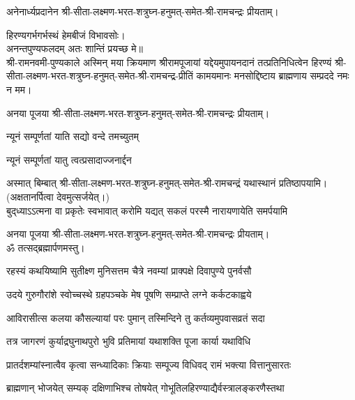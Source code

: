 अनेनार्ध्यप्रदानेन श्री-सीता-लक्ष्मण-भरत-शत्रुघ्न-हनुमत्-समेत-श्री-रामचन्द्रः प्रीयताम्।


हिरण्यगर्भगर्भस्थं हेमबीजं विभावसोः।\\
अनन्तपुण्यफलदम् अतः शान्तिं प्रयच्छ मे॥\\

श्री-रामनवमी-पुण्यकाले अस्मिन् मया क्रियमाण श्रीरामपूजायां यद्देयमुपायनदानं तत्प्रतिनिधित्वेन हिरण्यं श्री-सीता-लक्ष्मण-भरत-शत्रुघ्न-हनुमत्-समेत-श्री-रामचन्द्र-प्रीतिं 
कामयमानः मनसोद्दिष्टाय ब्राह्मणाय सम्प्रददे नमः न मम। 

अनया पूजया श्री-सीता-लक्ष्मण-भरत-शत्रुघ्न-हनुमत्-समेत-श्री-रामचन्द्रः प्रीयताम्। 
 
{न्यूनं सम्पूर्णतां याति सद्यो वन्दे तमच्युतम्} 

{न्यूनं सम्पूर्णतां यातु त्वत्प्रसादाज्जनार्द्दन}

अस्मात् बिम्बात् श्री-सीता-लक्ष्मण-भरत-शत्रुघ्न-हनुमत्-समेत-श्री-रामचन्द्रं यथास्थानं प्रतिष्ठापयामि।\\
(अक्षतानर्पित्वा देवमुत्सर्जयेत्।)\\

{बुद्‌ध्याऽऽत्मना वा प्रकृतेः स्वभावात्}
{करोमि यद्यत् सकलं परस्मै}
{नारायणायेति समर्पयामि}

अनया पूजया श्री-सीता-लक्ष्मण-भरत-शत्रुघ्न-हनुमत्-समेत-श्री-रामचन्द्रः प्रीयताम्। \\
ॐ तत्सद्ब्रह्मार्पणमस्तु।
 
\twolineshloka
{रहस्यं कथयिष्यामि सुतीक्ष्ण मुनिसत्तम}
{चैत्रे नवम्यां प्राक्पक्षे दिवापुण्ये पुनर्वसौ}%

\twolineshloka
{उदये गुरुगौरांशे स्वोच्चस्थे ग्रहपञ्चके}
{मेष पूषणि सम्प्राप्ते लग्ने कर्कटकाह्वये}%

\twolineshloka
{आविरासीत्स कलया कौसल्यायां परः पुमान्}
{तस्मिन्दिने तु कर्तव्यमुपवासव्रतं सदा}%

\twolineshloka
{तत्र जागरणं कुर्याद्रघुनाथपुरो भुवि}%
{प्रतिमायां यथाशक्ति पूजा कार्या यथाविधि}%

\twolineshloka
{प्रातर्दशम्यांस्नात्वैव कृत्वा सन्ध्यादिकाः क्रियाः}
{सम्पूज्य विधिवद् रामं भक्त्या वित्तानुसारतः}%

\twolineshloka
{ब्राह्मणान् भोजयेत् सम्यक् दक्षिणाभिश्च तोषयेत्}
{गोभूतिलहिरण्याद्यैर्वस्त्रालङ्करणैस्तथा}%

